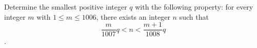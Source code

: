 Determine the smallest positive integer $q$ with the following property: for  every  integer $m$ with  $1\leqslant m\leqslant 1006$,  there  exists  an  integer $n$ such that$$\dfrac{m}{1007}q<n<\dfrac{m+1}{1008}q$$.